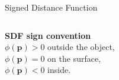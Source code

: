 \documentclass[10pt, aspectratio=169]{beamer}
\begin{document}
\begin{frame}{Signed Distance Function}
  \begin{columns}[T,onlytextwidth]
    \begin{column}{0.35\textwidth}
      \vspace{8.0em}
      \textbf{SDF sign convention} \\
      $\phi(\mathbf{p}) > 0$ outside the object,\; \\
      $\phi(\mathbf{p}) = 0$ on the surface,\; \\
      $\phi(\mathbf{p}) < 0$ inside.
    \end{column}

    \begin{column}{0.65\textwidth}
      \centering


\end{column}
\end{columns}
\end{frame}
\end{document}

